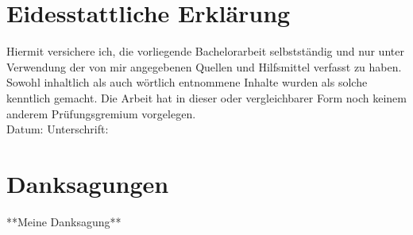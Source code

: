 \pagestyle{empty}
\setcounter{secnumdepth}{0}
\section{Eidesstattliche Erklärung}

Hiermit versichere ich, die vorliegende Bachelorarbeit selbstständig und nur unter Verwendung der von mir angegebenen Quellen und Hilfsmittel verfasst zu haben. Sowohl inhaltlich als auch wörtlich entnommene Inhalte wurden als solche kenntlich gemacht. Die Arbeit hat in dieser oder vergleichbarer Form noch keinem anderem Prüfungsgremium vorgelegen.
\\[1.5cm]
Datum:	\hrulefill\enspace Unterschrift: \hrulefill


\newpage

\section{Danksagungen}
**Meine Danksagung**
